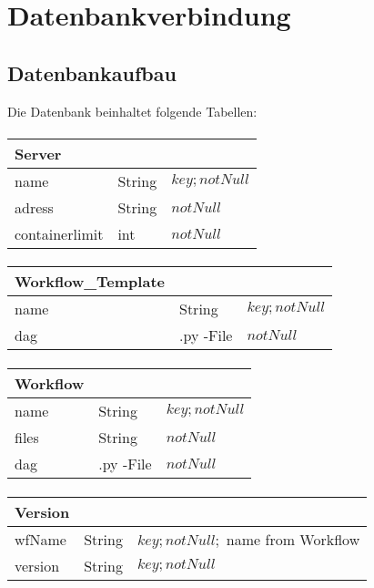 \section{Datenbankverbindung}

\subsection{Datenbankaufbau}
Die Datenbank beinhaltet folgende Tabellen:

\paragraph{}
\begin{tabular}{|p{4cm}|p{2cm}|p{6cm}|}
	\hline
	\textbf{Server} &  & \\
	\hline
	name & String & $key; notNull$ \\
	\hline
	adress & String & $notNull$\\
	\hline
	containerlimit & int & $notNull$\\
	\hline
\end{tabular}

\paragraph{}
\begin{tabular}{|p{4cm}|p{2cm}|p{6cm}|}
	\hline
	\textbf{Workflow\_Template} &  & \\
	\hline
	name & String & $key; notNull$ \\
	\hline
	dag & .py -File & $notNull$\\
	\hline
\end{tabular}

\paragraph{}
\begin{tabular}{|p{4cm}|p{2cm}|p{6cm}|}
	\hline
	\textbf{Workflow} &  & \\
	\hline
	name & String & $key; notNull$ \\
	\hline
	files & String & $notNull$ \\
	\hline
	dag & .py  -File & $notNull$\\
	\hline
\end{tabular}

\paragraph{}
\begin{tabular}{|p{4cm}|p{2cm}|p{6cm}|}
	\hline
	\textbf{Version} & & \\
	\hline
	wfName & String & $key; notNull;$ name from Workflow\\
	\hline
	version & String & $key; notNull$ \\
	\hline
\end{tabular}

